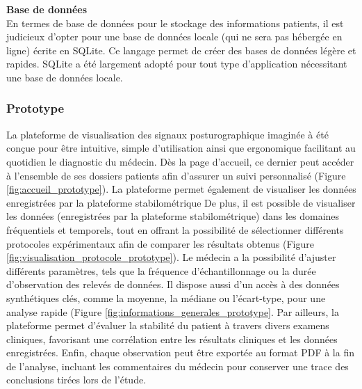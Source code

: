 \textbf{Base de données} \\
En termes de base de données pour le stockage des informations patients, il est judicieux d’opter pour une base de données locale (qui ne sera pas hébergée en ligne) écrite en SQLite.
Ce langage permet de créer des bases de données légère et rapides.
SQLite a été largement adopté pour tout type d’application nécessitant une base de données locale.

\subsubsection{Prototype}
La plateforme de visualisation des signaux posturographique imaginée à été conçue 
pour être intuitive, simple d’utilisation ainsi que ergonomique facilitant au 
quotidien le diagnostic du médecin. Dès la page d’accueil, ce dernier peut accéder 
à l’ensemble de ses dossiers patients afin d’assurer un suivi personnalisé 
(Figure \ref{fig:accueil_prototype}). La plateforme permet également de visualiser les données 
enregistrées par la plateforme stabilométrique 
De plus, il est possible de visualiser les données 
(enregistrées par la plateforme stabilométrique) dans les domaines fréquentiels 
et temporels, tout en offrant la possibilité de sélectionner différents protocoles 
expérimentaux afin de comparer les résultats obtenus (Figure \ref{fig:visualisation_protocole_prototype}). 
Le médecin a la possibilité d’ajuster différents paramètres, tels que la fréquence 
d’échantillonnage ou la durée d’observation des relevés de données.  Il dispose 
aussi d’un accès à des données synthétiques clés, comme la moyenne, la médiane ou 
l’écart-type, pour une analyse rapide (Figure \ref{fig:informations_generales_prototype}. Par ailleurs, la plateforme 
permet d’évaluer la stabilité du patient à travers divers examens cliniques, 
favorisant une corrélation entre les résultats cliniques et les données 
enregistrées. Enfin, chaque observation peut être exportée au format PDF à la fin 
de l’analyse, incluant les commentaires du médecin pour conserver une trace des 
conclusions tirées lors de l’étude.


